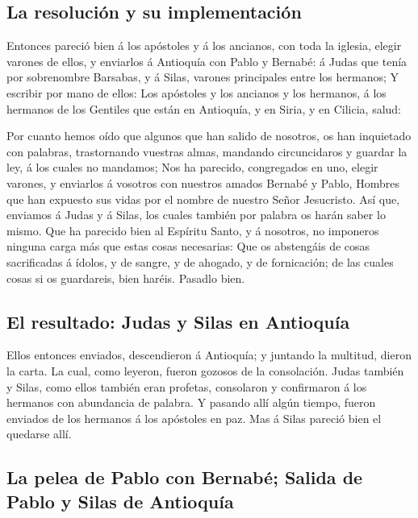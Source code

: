 \hypertarget{la-resoluciuxf3n-y-su-implementaciuxf3n}{%
\subsection{La resolución y su
implementación}\label{la-resoluciuxf3n-y-su-implementaciuxf3n}}

 Entonces pareció bien á los apóstoles y á los ancianos,
con toda la iglesia, elegir varones de ellos, y enviarlos á Antioquía
con Pablo y Bernabé: á Judas que tenía por sobrenombre Barsabas, y á
Silas, varones principales entre los hermanos;  Y escribir
por mano de ellos: Los apóstoles y los ancianos y los hermanos, á los
hermanos de los Gentiles que están en Antioquía, y en Siria, y en
Cilicia, salud:

 Por cuanto hemos oído que algunos que han salido de
nosotros, os han inquietado con palabras, trastornando vuestras almas,
mandando circuncidaros y guardar la ley, á los cuales no mandamos;
 Nos ha parecido, congregados en uno, elegir varones, y
enviarlos á vosotros con nuestros amados Bernabé y Pablo, 
Hombres que han expuesto sus vidas por el nombre de nuestro Señor
Jesucristo.  Así que, enviamos á Judas y á Silas, los
cuales también por palabra os harán saber lo mismo.  Que ha
parecido bien al Espíritu Santo, y á nosotros, no imponeros ninguna
carga más que estas cosas necesarias:  Que os abstengáis de
cosas sacrificadas á ídolos, y de sangre, y de ahogado, y de
fornicación; de las cuales cosas si os guardareis, bien haréis. Pasadlo
bien.

\hypertarget{el-resultado-judas-y-silas-en-antioquuxeda}{%
\subsection{El resultado: Judas y Silas en
Antioquía}\label{el-resultado-judas-y-silas-en-antioquuxeda}}

 Ellos entonces enviados, descendieron á Antioquía; y
juntando la multitud, dieron la carta.  La cual, como
leyeron, fueron gozosos de la consolación.  Judas también y
Silas, como ellos también eran profetas, consolaron y confirmaron á los
hermanos con abundancia de palabra.  Y pasando allí algún
tiempo, fueron enviados de los hermanos á los apóstoles en paz.
 Mas á Silas pareció bien el quedarse allí.

\hypertarget{la-pelea-de-pablo-con-bernabuxe9-salida-de-pablo-y-silas-de-antioquuxeda}{%
\subsection{La pelea de Pablo con Bernabé; Salida de Pablo y Silas de
Antioquía}\label{la-pelea-de-pablo-con-bernabuxe9-salida-de-pablo-y-silas-de-antioquuxeda}}


